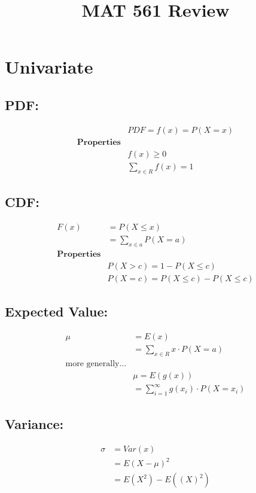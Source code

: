 \documentclass[11pt]{article}
\begin{document}
\title{MAT 561 Review} 
\date{} 
\maketitle	

\section{Univariate} 

\subsection*{PDF:}
\begin{align*} 
& PDF = f(x) = P(X=x)\\
\textbf{Properties} \\
& f(x) \geq 0 \\
& \sum_{x \in R}^{} f(x) = 1 
\end{align*}

\subsection*{CDF:}
\begin{align*}
F(x) &= P(X \leq x) \\
	 &= \sum_{x \in a}^{} P(X=a)\\
\textbf{Properties} \\
&P(X>c) = 1 - P(X \leq c)\\ 
&P(X=c) = P(X \leq c) - P(X \le c)
\end{align*}

\subsection*{Expected Value:}
\begin{align*}
\mu &= E(x) \\
	&= \sum_{x \in R}^{} x \cdot P(X=a) \\
	\text{more generally...} \\ 
	& \mu = E(g(x)) \\ 
	&= \sum_{i=1}^{\infty}g(x_i) \cdot P(X=x_i)
\end{align*}

\subsection*{Variance:}
\begin{align*}
\sigma &= Var(x) \\
	&= E(X-\mu)^2 \\ 
	&= E(X^2) - E((X)^2) 
\end{align*}
\end{document}
